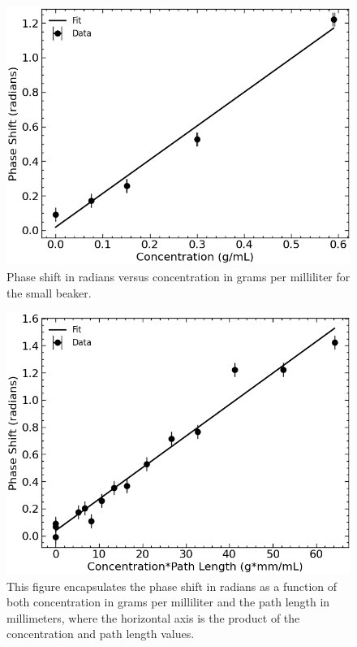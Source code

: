 \begin{figure}[H]
    \begin{center}
        \includegraphics[width=\columnwidth]{../figures/small_beaker_phase_shifts.png}
    \end{center}
    \caption{Phase shift in radians versus concentration in grams per milliliter for the small beaker.}
    \label{small_beaker_phase_shifts_figure}
\end{figure}

\begin{figure}[H]
	\begin{center}
		\includegraphics[width=\columnwidth]{../figures/concentration_times_diameter_phase_shifts.png}
	\end{center}
	\caption{This figure encapsulates the phase shift in radians as a function of both concentration in grams per milliliter and the path length in millimeters, where the horizontal axis is the product of the concentration and path length values.}
	\label{concentration_times_diameter_phase_shifts_figure}
\end{figure}

